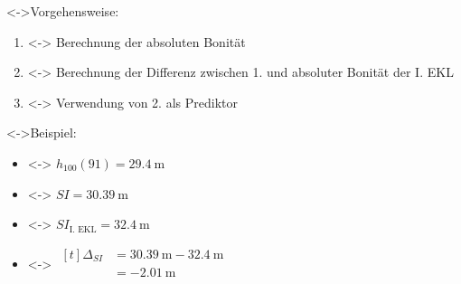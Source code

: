 \begin{frame}[c]

  \visible<\theFirstElement->{Vorgehensweise:}
  \begin{enumerate}
  \item<\theFirstElement-> Berechnung der absoluten Bonität
  \item<\theFirstElement-> Berechnung der Differenz zwischen 1. und absoluter Bonität der I. EKL
  \item<\theFirstElement-> Verwendung von 2. als Prediktor
  \end{enumerate}

  \visible<\theSecondElement->{Beispiel:}
  \begin{itemize}
  \item<\theSecondElement-> \(h_{100}(91) = \SI{29.4}{\meter}\)
  \item<\theSecondElement-> \(SI = \SI{30.39}{\meter}\)
  \item<\theSecondElement-> \(SI_{\text{I. EKL}} = \SI{32.4}{\meter}\)
  \item<\theSecondElement-> \(\begin{aligned}[t]
                              \Delta_{SI} &= \SI{30.39}{\meter} - \SI{32.4}{\meter} \\
                                          &= \SI{-2.01}{\meter} \\
                            \end{aligned}\)
  \end{itemize}

\end{frame}

